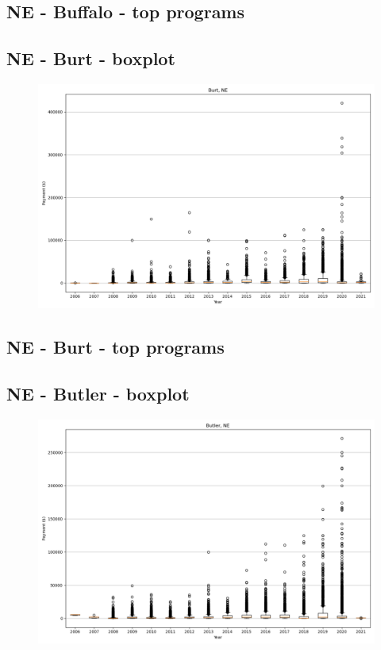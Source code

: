 \subsection*{NE - Buffalo - top programs}

\newpage
\subsection*{NE - Burt - boxplot}
\begin{figure}[h]
\centering
\includegraphics[width=7in]{../output/boxplots/counties/Burt-NE_boxplot.png}
\end{figure}


\subsection*{NE - Burt - top programs}

\newpage
\subsection*{NE - Butler - boxplot}
\begin{figure}[h]
\centering
\includegraphics[width=7in]{../output/boxplots/counties/Butler-NE_boxplot.png}
\end{figure}


